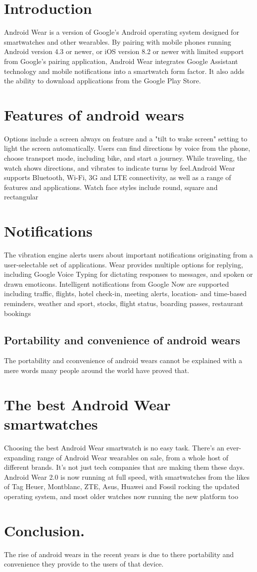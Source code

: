 \documentclass[9pt,a4paper]{article}
\begin{document}
\section{Introduction}
Android Wear is a version of Google's Android operating system designed for smartwatches and other wearables\cite{one}. By pairing with mobile phones running Android version 4.3 or newer, or iOS version 8.2 or newer with limited support from Google's pairing application, Android Wear integrates Google Assistant technology and mobile notifications into a smartwatch form factor. It also adds the ability to download applications from the Google Play Store\cite{one}.
\section{Features of android wears}
Options include a screen always on feature and a "tilt to wake screen" setting to light the screen automatically\cite{four}.
Users can find directions by voice from the phone, choose transport mode, including bike, and start a journey. While traveling, the watch shows directions, and vibrates to indicate turns by feel.Android Wear supports Bluetooth\cite{ten}, Wi-Fi, 3G and LTE connectivity, as well as a range of features and applications. Watch face styles include round, square and rectangular\cite{nine}
\section{Notifications}
The vibration engine alerts users about important notifications originating from a user-selectable set of applications. Wear provides multiple options for replying, including Google Voice Typing for dictating responses to messages\cite{one}, and spoken or drawn emoticons.
Intelligent notifications from Google Now are supported including traffic, flights, hotel check-in, meeting alerts, location- and time-based reminders, weather and sport, stocks, flight status, boarding passes, restaurant bookings
\subsection{Portability and convenience of android wears}
The  portability and cconvenience of android wears cannot be explained with a mere words many people around the world have proved\cite{two} 
that.
\section{The best Android Wear smartwatches}
Choosing the best Android Wear smartwatch is no easy task\cite{six}. There's an ever-expanding range of Android Wear wearables on sale, from a whole host of different brands. It's not just tech companies that are making them these days.
Android Wear 2.0 is now running at full speed, with smartwatches from the likes of Tag Heuer\cite{eight}, Montblanc\cite{seven}, ZTE, Asus, Huawei and Fossil rocking the updated operating system, and most older watches now running the new platform too
\section{Conclusion.}
The rise of android wears in the recent  years is due to there portability and convenience they provide to the users 
of that device.

\newpage



\end{document}
